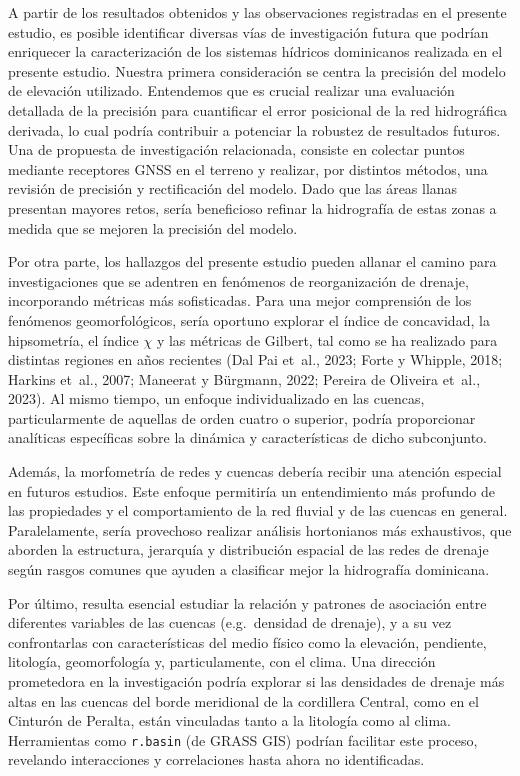 \documentclass[spanish]{article}
\begin{document}
A partir de los resultados obtenidos y las observaciones registradas en
el presente estudio, es posible identificar diversas vías de
investigación futura que podrían enriquecer la caracterización de los
sistemas hídricos dominicanos realizada en el presente estudio. Nuestra
primera consideración se centra la precisión del modelo de elevación
utilizado. Entendemos que es crucial realizar una evaluación detallada
de la precisión para cuantificar el error posicional de la red
hidrográfica derivada, lo cual podría contribuir a potenciar la robustez
de resultados futuros. Una de propuesta de investigación relacionada,
consiste en colectar puntos mediante receptores GNSS en el terreno y
realizar, por distintos métodos, una revisión de precisión y
rectificación del modelo. Dado que las áreas llanas presentan mayores
retos, sería beneficioso refinar la hidrografía de estas zonas a medida
que se mejoren la precisión del modelo.

Por otra parte, los hallazgos del presente estudio pueden allanar el
camino para investigaciones que se adentren en fenómenos de
reorganización de drenaje, incorporando métricas más sofisticadas. Para
una mejor comprensión de los fenómenos geomorfológicos, sería oportuno
explorar el índice de concavidad, la hipsometría, el índice \(\chi\) y
las métricas de Gilbert, tal como se ha realizado para distintas
regiones en años recientes (Dal Pai et~al., 2023; Forte y Whipple, 2018;
Harkins et~al., 2007; Maneerat y Bürgmann, 2022; Pereira de Oliveira
et~al., 2023). Al mismo tiempo, un enfoque individualizado en las
cuencas, particularmente de aquellas de orden cuatro o superior, podría
proporcionar analíticas específicas sobre la dinámica y características
de dicho subconjunto.

Además, la morfometría de redes y cuencas debería recibir una atención
especial en futuros estudios. Este enfoque permitiría un entendimiento
más profundo de las propiedades y el comportamiento de la red fluvial y
de las cuencas en general. Paralelamente, sería provechoso realizar
análisis hortonianos más exhaustivos, que aborden la estructura,
jerarquía y distribución espacial de las redes de drenaje según rasgos
comunes que ayuden a clasificar mejor la hidrografía dominicana.

Por último, resulta esencial estudiar la relación y patrones de
asociación entre diferentes variables de las cuencas (e.g.~densidad de
drenaje), y a su vez confrontarlas con características del medio físico
como la elevación, pendiente, litología, geomorfología y,
particulamente, con el clima. Una dirección prometedora en la
investigación podría explorar si las densidades de drenaje más altas en
las cuencas del borde meridional de la cordillera Central, como en el
Cinturón de Peralta, están vinculadas tanto a la litología como al
clima. Herramientas como \texttt{r.basin} (de GRASS GIS) podrían
facilitar este proceso, revelando interacciones y correlaciones hasta
ahora no identificadas.
\end{document}
